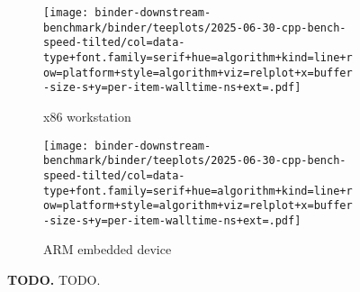 \begin{figure}


\begin{subfigure}{\linewidth}
\texttt{[image: binder-downstream-benchmark/binder/teeplots/2025-06-30-cpp-bench-speed-tilted/col=data-type+font.family=serif+hue=algorithm+kind=line+row=platform+style=algorithm+viz=relplot+x=buffer-size-s+y=per-item-walltime-ns+ext=.pdf]}
\caption{\small x86 workstation}
\label{fig:speed:thinkpad}
\end{subfigure}

\begin{subfigure}{\linewidth}
\texttt{[image: binder-downstream-benchmark/binder/teeplots/2025-06-30-cpp-bench-speed-tilted/col=data-type+font.family=serif+hue=algorithm+kind=line+row=platform+style=algorithm+viz=relplot+x=buffer-size-s+y=per-item-walltime-ns+ext=.pdf]}
\caption{\small ARM embedded device}
\label{fig:speed:pi}
\end{subfigure}

\caption{%
\textbf{TODO.}
\small
TODO.
}
\label{fig:speed}
\end{figure}
